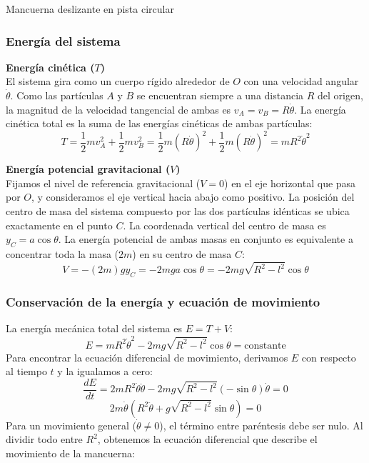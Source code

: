\begin{solucion}{Mancuerna deslizante en pista circular}
\subsubsection*{Energía del sistema}
\textbf{Energía cinética ($T$)}\\
El sistema gira como un cuerpo rígido alrededor de $O$ con una velocidad angular $\dot{\theta}$. Como las partículas $A$ y $B$ se encuentran siempre a una distancia $R$ del origen, la magnitud de la velocidad tangencial de ambas es $v_A = v_B = R\dot{\theta}$. La energía cinética total es la suma de las energías cinéticas de ambas partículas:
$$T = \frac{1}{2}m v_A^2 + \frac{1}{2}m v_B^2 = \frac{1}{2}m(R\dot{\theta})^2 + \frac{1}{2}m(R\dot{\theta})^2 = m R^2 \dot{\theta}^2$$

\textbf{Energía potencial gravitacional ($V$)}\\
Fijamos el nivel de referencia gravitacional ($V = 0$) en el eje horizontal que pasa por $O$, y consideramos el eje vertical hacia abajo como positivo. La posición del centro de masa del sistema compuesto por las dos partículas idénticas se ubica exactamente en el punto $C$. La coordenada vertical del centro de masa es $y_C = a\cos\theta$. La energía potencial de ambas masas en conjunto es equivalente a concentrar toda la masa ($2m$) en su centro de masa $C$:
$$V = -(2m)g y_C = -2mg a\cos\theta = -2mg\sqrt{R^2 - l^2}\cos\theta$$

\subsubsection*{Conservación de la energía y ecuación de movimiento}
La energía mecánica total del sistema es $E = T + V$:
$$E = m R^2 \dot{\theta}^2 - 2mg\sqrt{R^2 - l^2}\cos\theta = \text{constante}$$
Para encontrar la ecuación diferencial de movimiento, derivamos $E$ con respecto al tiempo $t$ y la igualamos a cero:
$$\frac{dE}{dt} = 2m R^2 \dot{\theta} \ddot{\theta} - 2mg\sqrt{R^2 - l^2}(-\sin\theta)\dot{\theta} = 0$$
$$2m\dot{\theta} \left( R^2\ddot{\theta} + g\sqrt{R^2 - l^2}\sin\theta \right) = 0$$
Para un movimiento general ($\dot{\theta} \neq 0$), el término entre paréntesis debe ser nulo. Al dividir todo entre $R^2$, obtenemos la ecuación diferencial que describe el movimiento de la mancuerna:


\end{solucion}
